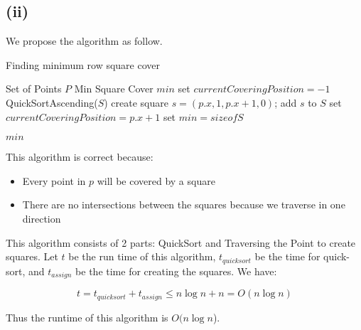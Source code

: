 \subsection*{(ii)}
\label{a-1-3-2}
We propose the algorithm as follow.

\begin{algorithm}
  \caption{Finding minimum row square cover}
  \label{alg:row_minimum}
  \begin{algorithmic}
    \Require Set of Points $P$
    \Ensure Min Square Cover $min$
    \renewcommand{\algorithmicrequire}{\textbf{Input:}}
    \renewcommand{\algorithmicensure}{\textbf{Output:}}
    \algnewcommand{}
    \algnewcommand\Operation{\item[\algorithmicoperation]}
    \Operation
    \State set $currentCoveringPosition = -1$
    \State QuickSortAscending($S$)
    \State create square $s = (p.x, 1, p.x + 1, 0)$;
    \State add $s$ to $S$
    \State set $currentCoveringPosition = p.x + 1$
    \EndIf
    \State set $min = size of S$

    \Return $min$
    \EndFor
  \end{algorithmic}
\end{algorithm}

This algorithm is correct because:

\begin{itemize}
    \item Every point in $p$ will be covered by a square
    \item There are no intersections between the squares because we traverse in one direction
  \end{itemize}

  This algorithm consists of 2 parts: QuickSort and Traversing the Point to create squares. Let $t$ be the run time of this algorithm, $t_{quicksort}$ be the time for quick-sort, and $t_{assign}$ be the time for creating the squares. We have:

  \begin{equation}
    t = t_{quicksort} + t_{assign} \leq n\log n + n = O(n\log n)
  \end{equation}

  Thus the runtime of this algorithm is $O(n\log n$).

